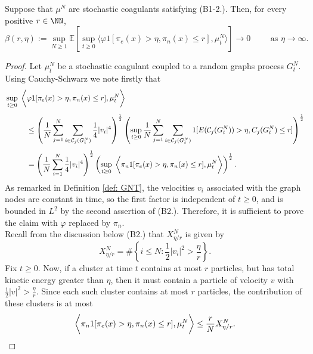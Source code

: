 \fi
\begin{lemma}\label{lemma: STUI}
Suppose that $\mu^N$ are stochastic coagulants satisfying (B1-2.). Then, for every positive $r \in \NN$,
\begin{equation}
    \beta(r,\eta):= \sup_{N\geq 1}
      \mathbb{E}\left[\sup_{t\geq 0}\bigg\langle \varphi 1[\pi_e(x)>\eta, \pi_n(x)\leq r], \mu^N_t\bigg\rangle \right]
    \rightarrow 0\hspace{1cm} \text{as }\eta\rightarrow \infty.
\end{equation}
\end{lemma}
\begin{proof}
Let $\mu^N_t$ be a stochastic coagulant coupled to a random graphs process $G^N_t$. Using Cauchy-Schwarz we note firstly that
\begin{equation} \begin{split}
 &\sup_{t\geq 0}\hspace{0.1cm}\bigg\langle \varphi 1[\pi_e(x)>\eta, \pi_n(x)\leq r], \mu^N_t\bigg\rangle
  \\[1ex] & \hspace{1cm}
\leq
  \left(\frac1N\sum_{j=1}^N \sum_{i \in \mathcal{C}_j(G_t^N)}\frac14 |v_i|^4 \right)^{\frac12}
  \left(\sup_{t\geq 0}\frac1N \sum_{j=1}^N\sum_{i \in \mathcal{C}_j(G_t^N)}
    1[E(\mathcal{C}_j(G_t^N)) > \eta, C_j(G_t^N)\leq r]\right)^{\frac12} \\[1ex] & \hspace{1cm}
=
  \left(\frac1N\sum_{i=1}^N \frac14 |v_i|^4 \right)^{\frac12}
  \left(\sup_{t\geq 0}\hspace{0.1cm}\bigg\langle \pi_n 1[\pi_e(x)>\eta, \pi_n(x)\leq r], \mu^N_t\bigg\rangle\right)^{\frac12}.
\end{split}\end{equation}
As remarked in Definition \ref{def: GNT}, the velocities $v_i$ associated with the graph nodes are constant in time, so the first factor is independent of $t\ge 0$, and is bounded in $L^2$ by the second assertion of (B2.).
Therefore, it is sufficient to prove the claim with $\varphi$ replaced by $\pi_n$.
\bigskip \\  Recall from the discussion below (B2.) that $X^N_{\eta/r}$ is given by \begin{equation} X^N_{\eta/r}=\#\left\{i\le N: \frac{1}{2}|v_i|^2>\frac{\eta}{r}\right\}.\end{equation} Fix $t\ge 0$. Now, if a cluster at time $t$ contains at most $r$ particles, but has total kinetic energy greater than $\eta$, then it must contain a particle of velocity $v$ with $\frac{1}{2}|v|^2>\frac{\eta}{r}$. Since each such cluster contains at most $r$ particles, the contribution of these clusters is at most \begin{equation}\bigg \langle \pi_n 1[\pi_e(x)>\eta, \pi_n(x)\le r], \hspace{0.005cm}\mu^N_t\bigg \rangle \le \frac{r}{N} \hspace{0.005cm}X^N_{\eta/r}.   \end{equation}  

\end{proof}
